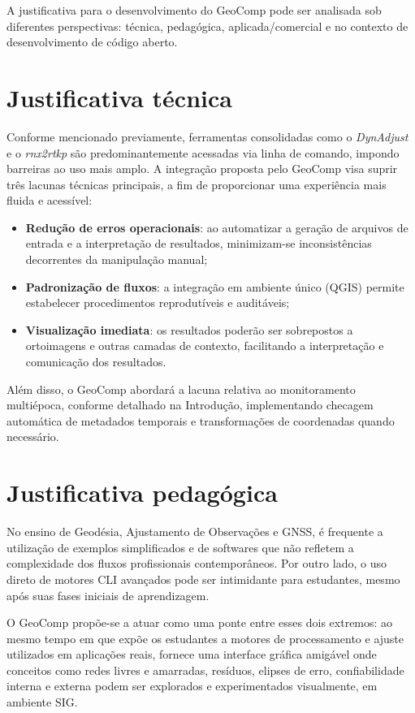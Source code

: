 \documentclass[
        12pt,                           %
        openright,                      %
        oneside,
        a4paper,                        %
        chapter=TITLE,         %
        section=TITLE,         %
        subsection=Title,      %
        english,                        %
        portugues,                      %
        ]{abntex2}
\begin{document}
A justificativa para o desenvolvimento do GeoComp pode ser analisada sob diferentes perspectivas: técnica, pedagógica, aplicada/comercial e no contexto de desenvolvimento de código aberto.

\section{Justificativa técnica}

Conforme mencionado previamente, ferramentas consolidadas como o \textit{DynAdjust} e o \textit{rnx2rtkp} são predominantemente acessadas via linha de comando, impondo barreiras ao uso mais amplo. A integração proposta pelo GeoComp visa suprir três lacunas técnicas principais, a fim de proporcionar uma experiência mais fluida e acessível:

\begin{itemize}
    \item \textbf{Redução de erros operacionais}: ao automatizar a geração de arquivos de entrada e a interpretação de resultados, minimizam-se inconsistências decorrentes da manipulação manual;
    \item \textbf{Padronização de fluxos}: a integração em ambiente único (QGIS) permite estabelecer procedimentos reprodutíveis e auditáveis;
    \item \textbf{Visualização imediata}: os resultados poderão ser sobrepostos a ortoimagens e outras camadas de contexto, facilitando a interpretação e comunicação dos resultados.
\end{itemize}

Além disso, o GeoComp abordará a lacuna relativa ao monitoramento multiépoca, conforme detalhado na Introdução, implementando checagem automática de metadados temporais e transformações de coordenadas quando necessário.


\section{Justificativa pedagógica}

No ensino de Geodésia, Ajustamento de Observações e GNSS, é frequente a utilização de exemplos simplificados e de softwares que não refletem a complexidade dos fluxos profissionais contemporâneos. Por outro lado, o uso direto de motores CLI avançados pode ser intimidante para estudantes, mesmo após suas fases iniciais de aprendizagem.

O GeoComp propõe-se a atuar como uma ponte entre esses dois extremos: ao mesmo tempo em que expõe os estudantes a motores de processamento e ajuste utilizados em aplicações reais, fornece uma interface gráfica amigável onde conceitos como redes livres e amarradas, resíduos, elipses de erro, confiabilidade interna e externa podem ser explorados e experimentados visualmente, em ambiente SIG.
\end{document}
